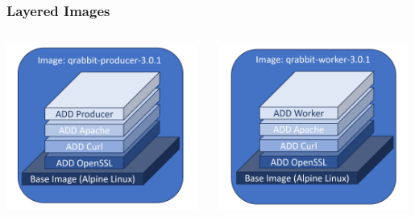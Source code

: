 \begin{frame}
\frametitle{Layered Images}
\begin{columns}
	\begin{center}	
	\includegraphics[width=0.98\textwidth]{img/image_01.png}
	\end{center}
	\begin{center}	
	\includegraphics[width=0.98\textwidth]{img/image_02.png}
	\end{center}
\end{columns}
\end{frame}